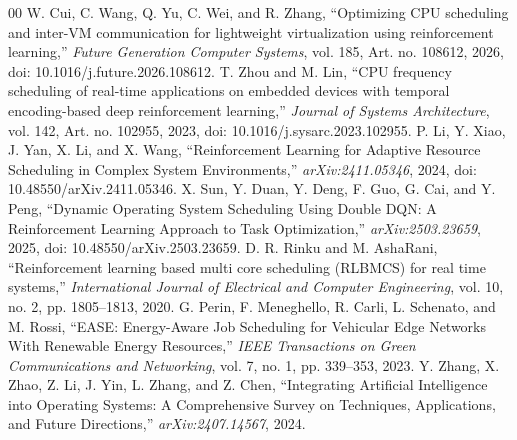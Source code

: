 \documentclass[conference]{IEEEtran}
\begin{document}
\begin{thebibliography}{00}
 W. Cui, C. Wang, Q. Yu, C. Wei, and R. Zhang, ``Optimizing CPU scheduling and inter-VM communication for lightweight virtualization using reinforcement learning,'' \textit{Future Generation Computer Systems}, vol. 185, Art. no. 108612, 2026, doi: 10.1016/j.future.2026.108612.
 T. Zhou and M. Lin, ``CPU frequency scheduling of real-time applications on embedded devices with temporal encoding-based deep reinforcement learning,'' \textit{Journal of Systems Architecture}, vol. 142, Art. no. 102955, 2023, doi: 10.1016/j.sysarc.2023.102955.
 P. Li, Y. Xiao, J. Yan, X. Li, and X. Wang, ``Reinforcement Learning for Adaptive Resource Scheduling in Complex System Environments,'' \textit{arXiv:2411.05346}, 2024, doi: 10.48550/arXiv.2411.05346.
 X. Sun, Y. Duan, Y. Deng, F. Guo, G. Cai, and Y. Peng, ``Dynamic Operating System Scheduling Using Double DQN: A Reinforcement Learning Approach to Task Optimization,'' \textit{arXiv:2503.23659}, 2025, doi: 10.48550/arXiv.2503.23659.
 D. R. Rinku and M. AshaRani, ``Reinforcement learning based multi core scheduling (RLBMCS) for real time systems,'' \textit{International Journal of Electrical and Computer Engineering}, vol. 10, no. 2, pp. 1805--1813, 2020.
 G. Perin, F. Meneghello, R. Carli, L. Schenato, and M. Rossi, ``EASE: Energy-Aware Job Scheduling for Vehicular Edge Networks With Renewable Energy Resources,'' \textit{IEEE Transactions on Green Communications and Networking}, vol. 7, no. 1, pp. 339--353, 2023.
 Y. Zhang, X. Zhao, Z. Li, J. Yin, L. Zhang, and Z. Chen, ``Integrating Artificial Intelligence into Operating Systems: A Comprehensive Survey on Techniques, Applications, and Future Directions,'' \textit{arXiv:2407.14567}, 2024.
\end{thebibliography}
\end{document}
